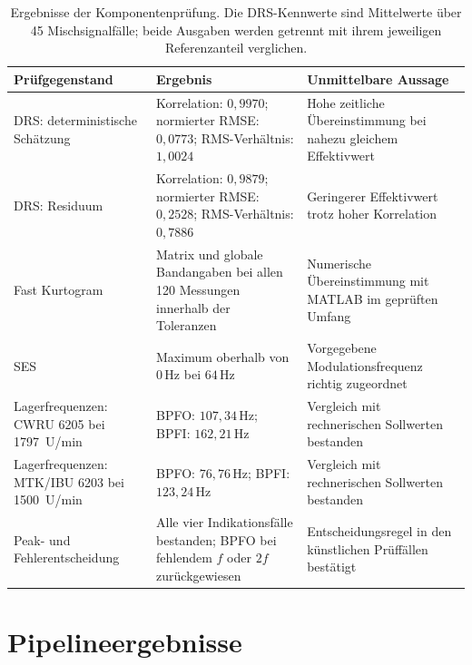 \begin{table}[htbp]
  \centering
  \caption{Ergebnisse der Komponentenprüfung. Die DRS-Kennwerte sind
    Mittelwerte über 45 Mischsignalfälle; beide Ausgaben werden getrennt
    mit ihrem jeweiligen Referenzanteil verglichen.}
  \label{tab:komponentenvalidierung_ergebnisse}
  \small
  \begin{tabularx}{\textwidth}{|
      >{\raggedright\arraybackslash}p{3.0cm}|
      >{\raggedright\arraybackslash}X|
      >{\raggedright\arraybackslash}p{4.0cm}|}
    \hline
    \textbf{Prüfgegenstand} & \textbf{Ergebnis} &
    \textbf{Unmittelbare Aussage} \\
    \hline
    DRS: deterministische Schätzung &
    Korrelation: $0{,}9970$; normierter RMSE: $0{,}0773$;
    RMS-Verhältnis: $1{,}0024$ &
    Hohe zeitliche Übereinstimmung bei nahezu gleichem Effektivwert \\
    \hline
    DRS: Residuum &
    Korrelation: $0{,}9879$; normierter RMSE: $0{,}2528$;
    RMS-Verhältnis: $0{,}7886$ &
    Geringerer Effektivwert trotz hoher Korrelation \\
    \hline
    Fast Kurtogram &
    Matrix und globale Bandangaben bei allen 120 Messungen innerhalb
    der Toleranzen &
    Numerische Übereinstimmung mit MATLAB im geprüften Umfang \\
    \hline
    SES &
    Maximum oberhalb von $0\,\mathrm{Hz}$ bei $64\,\mathrm{Hz}$ &
    Vorgegebene Modulationsfrequenz richtig zugeordnet \\
    \hline
    Lagerfrequenzen: CWRU 6205 bei 1797~U/min &
    BPFO: $107{,}34\,\mathrm{Hz}$; BPFI: $162{,}21\,\mathrm{Hz}$ &
    Vergleich mit rechnerischen Sollwerten bestanden \\
    \hline
    Lagerfrequenzen: MTK/IBU 6203 bei 1500~U/min &
    BPFO: $76{,}76\,\mathrm{Hz}$; BPFI: $123{,}24\,\mathrm{Hz}$ &
    Vergleich mit rechnerischen Sollwerten bestanden \\
    \hline
    Peak- und Fehlerentscheidung &
    Alle vier Indikationsfälle bestanden; BPFO bei fehlendem $f$ oder
    $2f$ zurückgewiesen &
    Entscheidungsregel in den künstlichen Prüffällen bestätigt \\
    \hline
  \end{tabularx}
\end{table}

\section{Pipelineergebnisse}
\label{sec:pipelineergebnisse}

